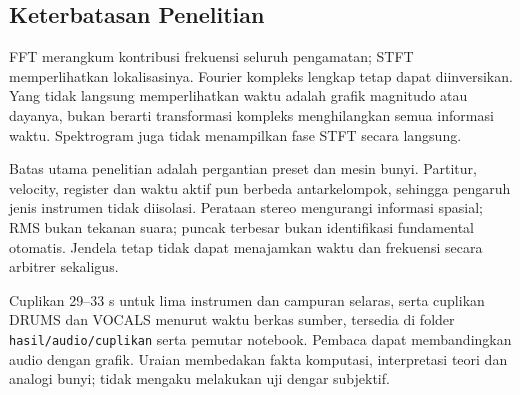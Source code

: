 
\subsection{Keterbatasan Penelitian}
FFT merangkum kontribusi frekuensi seluruh pengamatan; STFT
memperlihatkan lokalisasinya. Fourier kompleks lengkap tetap dapat
diinversikan. Yang tidak langsung memperlihatkan waktu adalah
grafik magnitudo atau dayanya, bukan berarti transformasi kompleks
menghilangkan semua informasi waktu. Spektrogram juga tidak
menampilkan fase STFT secara langsung.

Batas utama penelitian adalah pergantian preset dan mesin bunyi.
Partitur, velocity, register dan waktu aktif pun berbeda antarkelompok,
sehingga pengaruh jenis instrumen tidak diisolasi. Perataan stereo
mengurangi informasi spasial; RMS bukan tekanan suara; puncak
terbesar bukan identifikasi fundamental otomatis. Jendela tetap
tidak dapat menajamkan waktu dan frekuensi secara arbitrer sekaligus.

Cuplikan 29--33 s untuk lima instrumen dan campuran selaras, serta
cuplikan DRUMS dan VOCALS menurut waktu berkas sumber, tersedia
di folder \texttt{hasil/audio/cuplikan} serta pemutar notebook. Pembaca dapat
membandingkan audio dengan grafik. Uraian membedakan fakta komputasi,
interpretasi teori dan analogi bunyi; tidak mengaku melakukan uji
dengar subjektif.

